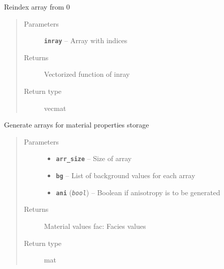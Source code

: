 \documentclass[letterpaper,10pt,english]{sphinxmanual}
\begin{document}

\begin{fulllineitems}
\label{hyvr:hyvr.hyvr.sim.reindex}
Reindex array from 0
\begin{quote}\begin{description}
\item[{Parameters}] \leavevmode
\textbf{\texttt{inray}} -- Array with indices

\item[{Returns}] \leavevmode
Vectorized function of inray

\item[{Return type}] \leavevmode
vecmat

\end{description}\end{quote}

\end{fulllineitems}


\begin{fulllineitems}
\label{hyvr:hyvr.hyvr.sim.save_arrays}
Generate arrays for material properties storage
\begin{quote}\begin{description}
\item[{Parameters}] \leavevmode\begin{itemize}
\item {} 
\textbf{\texttt{arr\_size}} -- Size of array

\item {} 
\textbf{\texttt{bg}} -- List of background values for each array

\item {} 
\textbf{\texttt{ani}} (\emph{\texttt{bool}}) -- Boolean if anisotropy is to be generated

\end{itemize}

\item[{Returns}] \leavevmode
Material values
fac:                    Facies values

\item[{Return type}] \leavevmode
mat

\end{description}\end{quote}

\end{fulllineitems}
\end{document}
